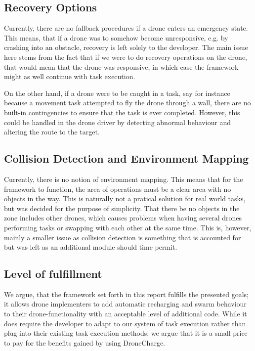\subsection{Recovery Options}
Currently, there are no fallback procedures if a drone enters an emergency state. This means, that if a drone was to somehow become unresponsive, e.g. by crashing into an obstacle, recovery is left solely to the developer. The main issue here stems from the fact that if we were to do recovery operations on the drone, that would mean that the drone was responsive, in which case the framework might as well continue with task execution.

On the other hand, if a drone were to be caught in a task, say for instance because a movement task attempted to fly the drone through a wall, there are no built-in contingencies to ensure that the task is ever completed. However, this could be handled in the drone driver by detecting abnormal behaviour and altering the route to the target.

\subsection{Collision Detection and Environment Mapping}
Currently, there is no notion of environment mapping. This means that for the framework to function, the area of operations must be a clear area with no  objects in the way. This is naturally not a pratical solution for real world tasks, but was decided for the purpose of simplicity. That there be no objects in the zone includes other drones, which causes problems when having several drones performing tasks or swapping with each other at the same time. This is, however, mainly a smaller issue as collision detection is something that is accounted for but was left as an additional module should time permit.

\subsection{Level of fulfillment}
We argue, that the framework set forth in this report fulfills the presented goals; it allows drone implementers to add automatic recharging and swarm behaviour to their drone-functionality with an acceptable level of additional code. While it does require the developer to adapt to our system of task execution rather than plug into their existing task execution methods, we argue that it is a small price to pay for the benefits gained by using DroneCharge.